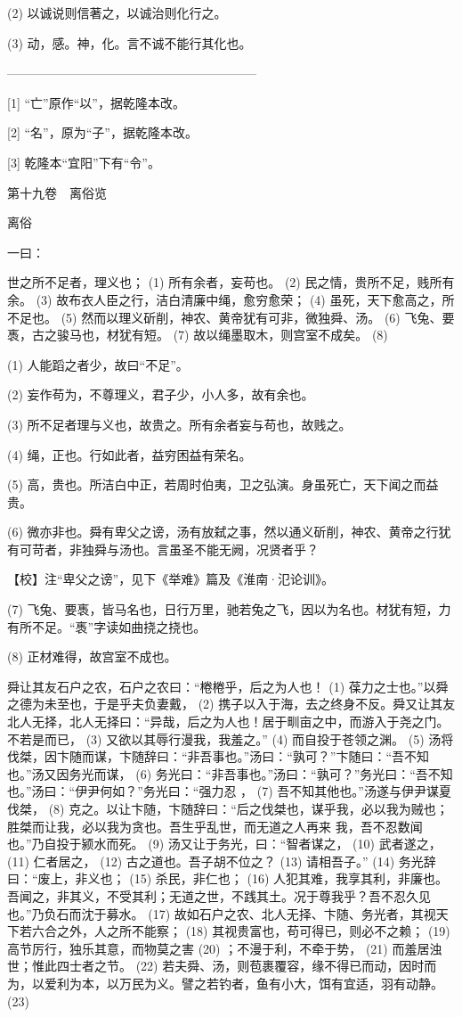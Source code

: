 \documentclass[12pt,UTF8]{ctexbook}
\begin{document}
(2) 以诚说则信著之，以诚治则化行之。

(3) 动，感。神，化。言不诚不能行其化也。




————————————————————

[1] “亡”原作“以”，据乾隆本改。

[2] “名”，原为“子”，据乾隆本改。

[3] 乾隆本“宜阳”下有“令”。





第十九卷　离俗览



离俗


一曰：

世之所不足者，理义也； (1) 所有余者，妄苟也。 (2) 民之情，贵所不足，贱所有余。 (3) 故布衣人臣之行，洁白清廉中绳，愈穷愈荣； (4) 虽死，天下愈高之，所不足也。 (5) 然而以理义斫削，神农、黄帝犹有可非，微独舜、汤。 (6) 飞兔、要褭，古之骏马也，材犹有短。 (7) 故以绳墨取木，则宫室不成矣。 (8)

(1) 人能蹈之者少，故曰“不足”。

(2) 妄作苟为，不尊理义，君子少，小人多，故有余也。

(3) 所不足者理与义也，故贵之。所有余者妄与苟也，故贱之。

(4) 绳，正也。行如此者，益穷困益有荣名。

(5) 高，贵也。所洁白中正，若周时伯夷，卫之弘演。身虽死亡，天下闻之而益贵。

(6) 微亦非也。舜有卑父之谤，汤有放弑之事，然以通义斫削，神农、黄帝之行犹有可苛者，非独舜与汤也。言虽圣不能无阙，况贤者乎？

【校】注“卑父之谤”，见下《举难》篇及《淮南·氾论训》。

(7) 飞兔、要褭，皆马名也，日行万里，驰若兔之飞，因以为名也。材犹有短，力有所不足。“褭”字读如曲挠之挠也。

(8) 正材难得，故宫室不成也。

舜让其友石户之农，石户之农曰：“棬棬乎，后之为人也！ (1) 葆力之士也。”以舜之德为未至也，于是乎夫负妻戴， (2) 携子以入于海，去之终身不反。舜又让其友北人无择，北人无择曰：“异哉，后之为人也！居于甽亩之中，而游入于尧之门。不若是而已， (3) 又欲以其辱行漫我，我羞之。” (4) 而自投于苍领之渊。 (5) 汤将伐桀，因卞随而谋，卞随辞曰：“非吾事也。”汤曰：“孰可？”卞随曰：“吾不知也。”汤又因务光而谋， (6) 务光曰：“非吾事也。”汤曰：“孰可？”务光曰：“吾不知也。”汤曰：“伊尹何如？”务光曰：“强力忍 ， (7) 吾不知其他也。”汤遂与伊尹谋夏伐桀， (8) 克之。以让卞随，卞随辞曰：“后之伐桀也，谋乎我，必以我为贼也；胜桀而让我，必以我为贪也。吾生乎乱世，而无道之人再来 我，吾不忍数闻也。”乃自投于颍水而死。 (9) 汤又让于务光，曰：“智者谋之， (10) 武者遂之， (11) 仁者居之， (12) 古之道也。吾子胡不位之？ (13) 请相吾子。” (14) 务光辞曰：“废上，非义也； (15) 杀民，非仁也； (16) 人犯其难，我享其利，非廉也。吾闻之，非其义，不受其利；无道之世，不践其土。况于尊我乎？吾不忍久见也。”乃负石而沈于募水。 (17) 故如石户之农、北人无择、卞随、务光者，其视天下若六合之外，人之所不能察； (18) 其视贵富也，苟可得已，则必不之赖； (19) 高节厉行，独乐其意，而物莫之害 (20) ；不漫于利，不牵于势， (21) 而羞居浊世；惟此四士者之节。 (22) 若夫舜、汤，则苞裹覆容，缘不得已而动，因时而为，以爱利为本，以万民为义。譬之若钓者，鱼有小大，饵有宜适，羽有动静。 (23)
\end{document}
